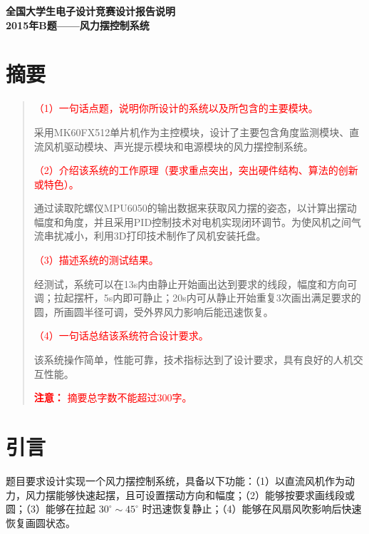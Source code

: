 \documentclass[zihao=-4,fontset=none]{ctexart}
\begin{document}
\begin{center}
    \huge \bfseries 全国大学生电子设计竞赛设计报告说明 \\
    \vspace{0.3cm}
    \Large 2015年B题——风力摆控制系统
    \vspace{0.5cm}
\end{center}

\section*{摘要}
\begin{quote}
    \noindent
    \textcolor{red}{（1）一句话点题，说明你所设计的系统以及所包含的主要模块。}
    
    采用MK60FX512单片机作为主控模块，设计了主要包含角度监测模块、直流风机驱动模块、声光提示模块和电源模块的风力摆控制系统。
    
    \vspace{0.3cm}
    \noindent
    \textcolor{red}{（2）介绍该系统的工作原理（要求重点突出，突出硬件结构、算法的创新或特色）。}
    
    通过读取陀螺仪MPU6050的输出数据来获取风力摆的姿态，以计算出摆动幅度和角度，并且采用PID控制技术对电机实现闭环调节。为使风机之间气流串扰减小，利用3D打印技术制作了风机安装托盘。
    
    \vspace{0.3cm}
    \noindent
    \textcolor{red}{（3）描述系统的测试结果。}
    
    经测试，系统可以在13s内由静止开始画出达到要求的线段，幅度和方向可调；拉起摆杆，5s内即可静止；20s内可从静止开始重复3次画出满足要求的圆，所画圆半径可调，受外界风力影响后能迅速恢复。
    
    \vspace{0.3cm}
    \noindent
    \textcolor{red}{（4）一句话总结该系统符合设计要求。}
    
    该系统操作简单，性能可靠，技术指标达到了设计要求，具有良好的人机交互性能。
    
    \vspace{0.5cm}
    \noindent
    \textcolor{red}{\textbf{注意：} 摘要总字数不能超过300字。}
\end{quote}

\newpage
\tableofcontents
\newpage

\section{引言}

题目要求设计实现一个风力摆控制系统，具备以下功能：（1）以直流风机作为动力，风力摆能够快速起摆，且可设置摆动方向和幅度；（2）能够按要求画线段或圆；（3）能够在拉起 $30^\circ \sim 45^\circ$ 时迅速恢复静止；（4）能够在风扇风吹影响后快速恢复画圆状态。
\end{document}
